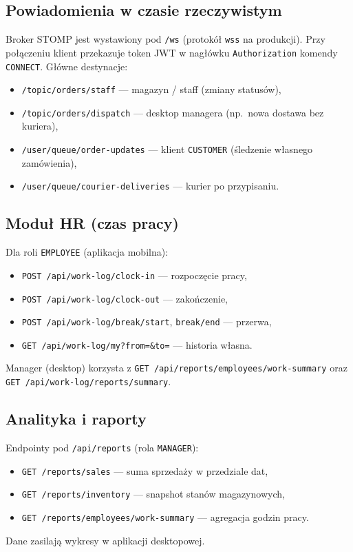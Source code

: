 \documentclass[12pt,a4paper]{report}
\newenvironment{calosc}{%
  \Needspace{14\baselineskip}%
  \begin{samepage}%
}{%
  \end{samepage}%
}
\begin{document}
\begin{calosc}
\section{Powiadomienia w czasie rzeczywistym}

Broker STOMP jest wystawiony pod \texttt{/ws} (protokół \texttt{wss} na produkcji). Przy połączeniu klient przekazuje token JWT w nagłówku \texttt{Authorization} komendy \texttt{CONNECT}. Główne destynacje:
\begin{itemize}[noitemsep]
  \item \texttt{/topic/orders/staff} --- magazyn / staff (zmiany statusów),
  \item \texttt{/topic/orders/dispatch} --- desktop managera (np.\ nowa dostawa bez kuriera),
  \item \texttt{/user/queue/order-updates} --- klient \texttt{CUSTOMER} (śledzenie własnego zamówienia),
  \item \texttt{/user/queue/courier-deliveries} --- kurier po przypisaniu.
\end{itemize}
\end{calosc}

\begin{calosc}
\section{Moduł HR (czas pracy)}

Dla roli \texttt{EMPLOYEE} (aplikacja mobilna):
\begin{itemize}[noitemsep]
  \item \texttt{POST /api/work-log/clock-in} --- rozpoczęcie pracy,
  \item \texttt{POST /api/work-log/clock-out} --- zakończenie,
  \item \texttt{POST /api/work-log/break/start}, \texttt{break/end} --- przerwa,
  \item \texttt{GET /api/work-log/my?from=\&to=} --- historia własna.
\end{itemize}
Manager (desktop) korzysta z \texttt{GET /api/reports/employees/work-summary} oraz \texttt{GET /api/work-log/reports/summary}.
\end{calosc}

\begin{calosc}
\section{Analityka i raporty}

Endpointy pod \texttt{/api/reports} (rola \texttt{MANAGER}):
\begin{itemize}[noitemsep]
  \item \texttt{GET /reports/sales} --- suma sprzedaży w przedziale dat,
  \item \texttt{GET /reports/inventory} --- snapshot stanów magazynowych,
  \item \texttt{GET /reports/employees/work-summary} --- agregacja godzin pracy.
\end{itemize}
Dane zasilają wykresy w aplikacji desktopowej.
\end{calosc}
\end{document}
